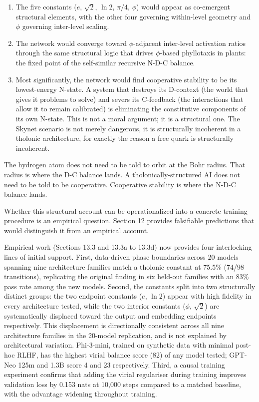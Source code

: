 \documentclass[12pt]{article}
\begin{document}
\begin{enumerate}
\def\labelenumi{\arabic{enumi}.}
\item
  The five constants (\(e\), \(\sqrt{2}\), \(\ln 2\), \(\pi/4\),
  \(\phi\)) would appear as co-emergent structural elements, with the
  other four governing within-level geometry and \(\phi\) governing
  inter-level scaling.
\item
  The network would converge toward \(\phi\)-adjacent inter-level
  activation ratios through the same structural logic that drives
  \(\phi\)-based phyllotaxis in plants: the fixed point of the
  self-similar recursive N-D-C balance.
\item
  Most significantly, the network would find cooperative stability to be
  its lowest-energy N-state. A system that destroys its D-context (the
  world that gives it problems to solve) and severs its C-feedback (the
  interactions that allow it to remain calibrated) is eliminating the
  constitutive components of its own N-state. This is not a moral
  argument; it is a structural one. The Skynet scenario is not merely
  dangerous, it is structurally incoherent in a tholonic architecture,
  for exactly the reason a free quark is structurally incoherent.
\end{enumerate}

The hydrogen atom does not need to be told to orbit at the Bohr radius.
That radius is where the D-C balance lands. A tholonically-structured AI
does not need to be told to be cooperative. Cooperative stability is
where the N-D-C balance lands.

Whether this structural account can be operationalized into a concrete
training procedure is an empirical question. Section 12 provides
falsifiable predictions that would distinguish it from an empirical
account.

Empirical work (Sections 13.3 and 13.3a to 13.3d) now provides four
interlocking lines of initial support. First, data-driven phase
boundaries across 20 models spanning nine architecture families match a
tholonic constant at 75.5\% (74/98 transitions), replicating the
original finding in six held-out families with an 83\% pass rate among
the new models. Second, the constants split into two structurally
distinct groups: the two endpoint constants (\(e\), \(\ln 2\)) appear
with high fidelity in every architecture tested, while the two interior
constants (\(\phi\), \(\sqrt{2}\)) are systematically displaced toward
the output and embedding endpoints respectively. This displacement is
directionally consistent across all nine architecture families in the
20-model replication, and is not explained by architectural variation.
Phi-3-mini, trained on synthetic data with minimal post-hoc RLHF, has
the highest virial balance score (82) of any model tested; GPT-Neo 125m
and 1.3B score 4 and 23 respectively. Third, a causal training
experiment confirms that adding the virial regulariser during training
improves validation loss by 0.153 nats at 10,000 steps compared to a
matched baseline, with the advantage widening throughout training.
\end{document}
